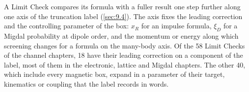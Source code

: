 A Limit Check compares its formula with a fuller result one step further along one axis of the truncation label (\cref{sec:9.4}). The axis fixes the leading correction and the controlling parameter of the box: $x_R$ for an impulse formula, $\xi_D$ for a Migdal probability at dipole order, and the momentum or energy along which screening changes for a formula on the many-body axis. Of the 58 Limit Checks of the channel chapters, 18 have their leading correction on a component of the label, most of them in the electronic, lattice and Migdal chapters. The other 40, which include every magnetic box, expand in a parameter of their target, kinematics or coupling that the label records in words.
